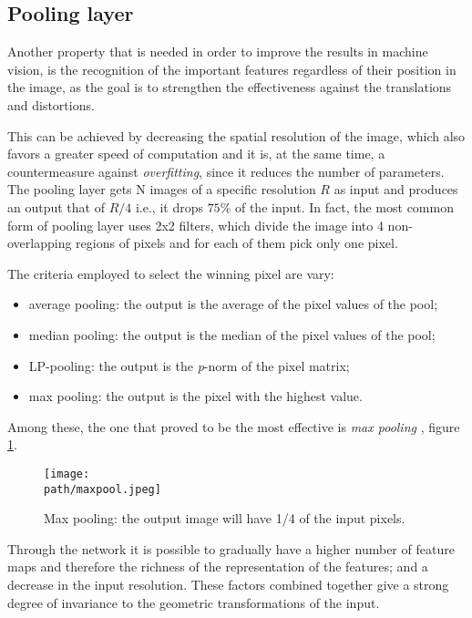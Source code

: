 \subsection {Pooling layer}
\label{subsec:pooling} 

Another property that is needed in order to improve the results in machine vision, is the recognition of the important features regardless of their position in the image, as the goal is to strengthen the effectiveness against the translations and distortions. 

This can be achieved by decreasing the spatial resolution of the image, which also favors a greater speed of computation and it is, at the same time, a countermeasure against \emph{overfitting}, since it reduces the number of parameters. The pooling layer gets N images of a specific resolution $R$ as input and produces an output that of $R/4$ i.e., it drops $75\%$ of the input. 
In fact, the most common form of pooling layer uses 2x2 filters, which divide the image into  4 non-overlapping regions of pixels and for each of them pick only one pixel. 

The criteria employed to select the winning pixel are vary:

\begin{itemize}
    \item average pooling: the output is the average of the pixel values of the pool;
    
    \item median pooling: the output is the median of the pixel values of the pool;
    
    \item LP-pooling: the output is the \emph{p}-norm of the pixel matrix;
    
    \item max pooling: the output is the pixel with the highest value.
\end{itemize}

Among these, the one that proved to be the most effective is \emph{max pooling} \parencite{Wcs231}, figure \ref{fig:maxpool}.

\begin{figure}[h!]
 \centering
 \texttt{[image: \\path/maxpool.jpeg]} 
 \caption{Max pooling: the output image will have 1/4 of the input pixels.}
 \label{fig:maxpool}
\end{figure}

Through the network it is possible to gradually have a higher number of feature maps and therefore the richness of the representation of the features; and a decrease in the input resolution. These factors combined together give a strong degree of invariance to the geometric transformations of the input.


